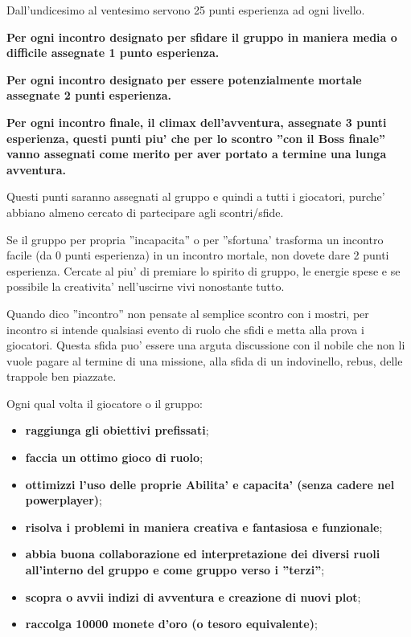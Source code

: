\documentclass[a4paper,11pt,twoside,openany]{book}
\begin{document}
{		Dall'undicesimo al ventesimo servono 25 punti esperienza ad ogni livello.
		
		\textbf{Per ogni incontro designato per sfidare il gruppo in maniera media o difficile assegnate 1 punto esperienza.}
		
		\textbf{Per ogni incontro designato per essere potenzialmente mortale assegnate 2 punti esperienza.}
		
		\textbf{Per ogni incontro finale, il climax dell'avventura, assegnate 3 punti esperienza, questi punti piu' che per lo scontro ''con il Boss finale'' vanno assegnati come merito per aver portato a termine una lunga avventura.}
		
		Questi punti saranno assegnati al gruppo e quindi a tutti i giocatori, purche' abbiano almeno cercato di partecipare agli scontri/sfide.
		
		Se il gruppo per propria ''incapacita'' o per ''sfortuna' trasforma un incontro facile (da 0 punti esperienza) in un incontro mortale, non dovete dare 2 punti esperienza. Cercate al piu' di premiare lo spirito di gruppo, le energie spese e se possibile la creativita' nell'uscirne vivi  nonostante tutto.
		
		Quando dico ''incontro'' non pensate al semplice scontro con i mostri, per incontro si intende qualsiasi evento di ruolo che sfidi e metta alla prova i giocatori. Questa sfida puo' essere una arguta discussione con il nobile che non li vuole pagare al termine di una missione, alla sfida di un indovinello, rebus, delle trappole ben piazzate.
		
		\bigskip
		
		Ogni qual volta il giocatore o il gruppo:
		\begin{itemize}
			\item 
			\textbf{raggiunga gli obiettivi prefissati}; 
			\item 
			\textbf{faccia un ottimo gioco di ruolo}; 
			\item 
			\textbf{ottimizzi l'uso delle proprie Abilita' e capacita' (senza cadere nel powerplayer)}; 
			\item 
			\textbf{risolva i problemi in maniera creativa e fantasiosa e funzionale}; 
			\item 
			\textbf{abbia buona collaborazione ed interpretazione dei diversi ruoli all'interno del gruppo e come gruppo verso i ''terzi''}; 
			\item 
			\textbf{scopra o avvii indizi di avventura e creazione di nuovi plot};
			\item
			\textbf{raccolga 10000 monete d'oro (o tesoro equivalente)};
		\end{itemize}
		
}
\end{document}
